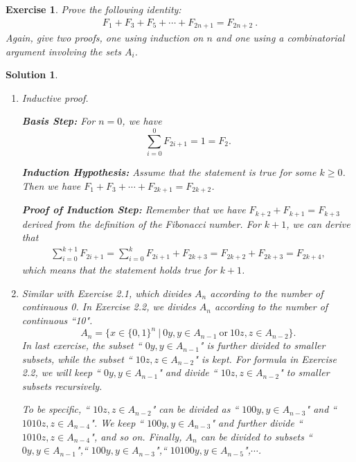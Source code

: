 \documentclass[12pt,a4]{article}
\newtheorem*{solution}{Solution}
\newtheorem{exercise}[theorem]{Exercise}
\begin{document}
\begin{exercise}
   Prove the following identity:
   \begin{align*}
      F_1 + F_3 + F_5 + \cdots + F_{2n+1} = F_{2n+2} \ .
   \end{align*}
   Again, give two proofs, one using induction on $n$ and one using a combinatorial argument 
   involving the sets $A_i$.
\end{exercise}

\begin{solution}\quad
   \begin{enumerate}
      \item Inductive proof.
      
      \textbf{Basis Step:} For $n=0$, we have 
      $$
      \sum_{i=0}^0F_{2i+1}=1=F_2.
      $$
    

     \textbf{Induction Hypothesis:} Assume that the statement is true for some $k\geq0$. Then we have $F_1+F_3+\cdots+F_{2k+1}=F_{2k+2}$.

     \textbf{Proof of Induction Step:} Remember that we have $F_{k+2}+F_{k+1}=F_{k+3}$ derived from the definition of the Fibonacci number. For $k+1$, we can derive that
     \begin{align*}
        \sum_{i=0}^{k+1}F_{2i+1}=\sum_{i=0}^kF_{2i+1}+F_{2k+3}
        =F_{2k+2}+F_{2k+3}=F_{2k+4},
     \end{align*}
     which means that the statement holds true for $k+1$.

     \item Similar with Exercise 2.1, which divides $A_n$ according to the number of continuous 0. In Exercise 2.2, we divides $A_n$ according to the number of continuous ``10".     
     $$
     A_n=\{x\in\{ 0,1\}^n\ |\ 0y, y\in A_{n-1}\  \text{or}\ 10z,z\in A_{n-2} \}.
     $$ 
     In last exercise, the subset `` $0y, y\in A_{n-1}$" is further divided to smaller subsets, while the subset `` $10z,z\in A_{n-2}$" is kept. For formula in Exercise 2.2, we will keep `` $0y, y\in A_{n-1}$" and divide `` $10z,z\in A_{n-2}$" to smaller subsets recursively.
     
     To be specific, `` $10z,z\in A_{n-2}$" can be divided as `` $100y, y\in A_{n-3}$" and `` $1010z,z\in A_{n-4}$". We keep `` $100y, y\in A_{n-3}$" and further divide `` $1010z,z\in A_{n-4}$", and so on. Finally, $A_n$ can be divided to subsets `` $0y, y\in A_{n-1}$",`` $100y, y\in A_{n-3}$",`` $10100y, y\in A_{n-5}$",$\cdots$.
     

\end{enumerate}
\end{solution}
\end{document}
